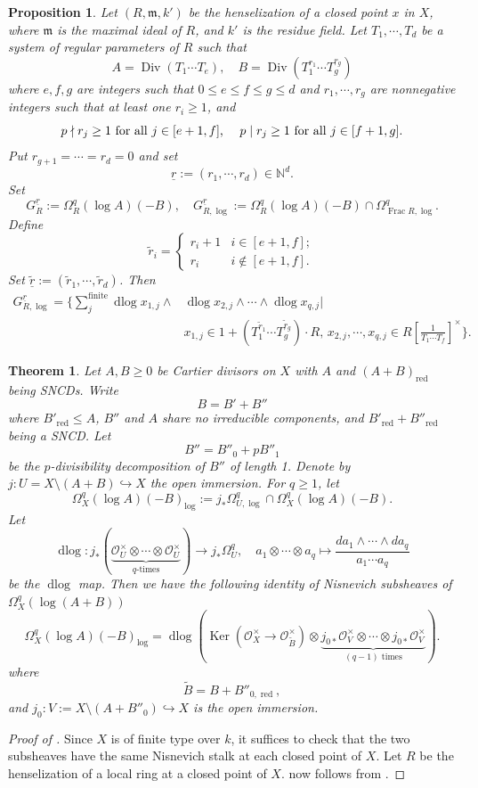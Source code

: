 \documentclass[10pt,a4paper]{amsart}
\newtheorem{thm}{Theorem}
\newtheorem{prop}{Proposition}
\newcommand{\Div}{\operatorname{Div}}
\newcommand{\Frac}{\operatorname{Frac}}
\newcommand{\Ker}{\operatorname{Ker}}
\newcommand{\N}{\mathbb{N}}
\newcommand{\cO}{\mathcal{O}}
\newcommand{\dlog}{\operatorname{dlog}}
\newcommand{\hra}{\hookrightarrow}
\newcommand{\ra}{\rightarrow}
\newcommand{\red}{{\operatorname{red}}}
\newcommand{\ssm}{\mathfrak{m}}
\renewcommand{\tilde}{\widetilde}
\newcommand{\ul}{\underline}
\begin{document}
\begin{prop}
\label{MainProp}
Let $(R,\ssm,k')$ be the henselization of a closed point $x$ in $X$, where $\ssm$ is the maximal ideal of $R$, and $k'$ is the residue field.
Let $T_1,\cdots , T_d$ be a system of regular parameters of $R$ such that 
$$A=\Div(T_1\cdots T_e), \quad
B=\Div(T_1^{r_1}\cdots   T_g^{r_g})$$
where $e,f,g$ are integers such that $0\le e\le f \le g\le d$  and $r_1,\cdots, r_g$ are nonnegative integers such that at least one $r_i\ge 1$, and
$$\text{$p\nmid r_j\ge 1$ for all $j\in [e+1,f]$,
\quad 
$p\mid r_j\ge 1$ for all $j\in [f+1,g]$.}$$
Put 
$r_{g+1}=\cdots =r_{d}=0$ and set
$$\ul r:=(r_1,\cdots, r_d)\in \N^d.$$
Set
$$G_{R}^{\ul r}:=
\Omega^q_R(\log A)(-B),\quad
G_{R,\log}^{\ul r}:=
\Omega^q_R(\log A)(-B)
\cap
\Omega^q_{\Frac R,\log}.$$
Define
$$\tilde r_i=
\begin{cases}
    r_i+1& i\in[e+1,f];
    \\
    r_i& i\notin [e+1,f].
\end{cases}$$
Set $\tilde{\underline{r}}:=(\tilde r_1,\cdots,\tilde r_d)$.
Then 
\begin{align}
\label{MainPropeq0}
G_{R,\log}^{\ul r}=
\Big\{
\sum_j^{\text{finite}}\dlog x_{1,j}\wedge &\dlog x_{2,j}\wedge\cdots \wedge\dlog x_{q,j}
\Big|
\\
&x_{1,j}\in 
1+(T_1^{\tilde r_1}\cdots  T_g^{\tilde r_g})\cdot R,\,
x_{2,j},\cdots,x_{q,j} \in R[\frac{1}{T_1\cdots T_f}]^\times
\Big\}.
\nonumber
\end{align}
\end{prop}

\begin{thm}
\label{thm1}
Let $A, B\ge 0$ be Cartier divisors on $X$ with $A$ and $(A+B)_\red$ being SNCDs. 
Write $$B=B'+B''$$ 
where 
$B'_\red\le A$, $B''$ and $A$ share no irreducible components, and $B'_\red+B''_\red$ being a SNCD. 
Let $$B''=B''_0+pB''_1$$
be the $p$-divisibility decomposition of $B''$ of length 1. 
Denote by $j:U=X\setminus (A+B)\hra X$ the open immersion.
For $q\ge 1$, let
$$\Omega^q_X(\log A)(-B)_{\log}:=
j_*\Omega^q_{U,\log}\cap \Omega^q_X(\log A)(-B).
$$
Let
$$\dlog:j_*(\underbrace{\cO_{U}^\times \otimes \cdots \otimes \cO_{U}^\times}_{q\text{-times}})
\ra j_*\Omega^q_U,\quad 
a_1\otimes \cdots\otimes a_q\mapsto \frac{da_1\wedge \cdots\wedge da_q}{a_1\cdots a_q}$$
be the $\dlog$ map.
Then 
we have the following identity of Nisnevich subsheaves of $\Omega^q_X(\log (A+B))$
$$\Omega^q_X(\log A)(-B)_{\log}=
\dlog
\left(
\Ker(\cO_X^\times \ra \cO_{\tilde B}^\times)\otimes 
\underbrace{ j_{0*}\cO_{V}^\times\otimes\cdots \otimes  j_{0*}\cO_{V}^\times}_{(q-1)\text{ times}}
\right).$$
where 
$$\tilde B=B+B''_{0,\red},$$
and
$j_0:V:=X\setminus (A+B''_0)\hra X$ is the open immersion.
\end{thm}

\begin{proof}[{Proof of }]
Since $X$ is of finite type over $k$, it suffices to check that the two subsheaves have the same Nisnevich stalk at each closed point of $X$.
Let $R$ be the henselization of a local ring at a closed point of $X$.
 now follows from .
\end{proof}
\end{document}
